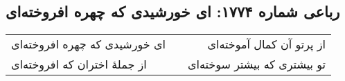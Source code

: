 \begin{center}
\section*{رباعی شماره ۱۷۷۴: ای خورشیدی که چهره افروخته‌ای}
\label{sec:1774}
\begin{longtable}{l p{0.5cm} r}
ای خورشیدی که چهره افروخته‌ای
&&
از پرتو آن کمال آموخته‌ای
\\
از جملهٔ اختران که افروخته‌ای
&&
تو بیشتری که بیشتر سوخته‌ای
\\
\end{longtable}
\end{center}
